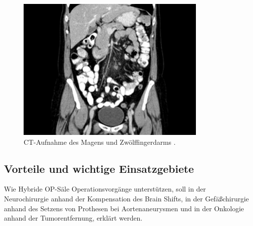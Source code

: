 \begin{figure}[!htb]
	\includegraphics[width=\linewidth]{Content/Pictures/mrtct.png}
	\caption{CT-Aufnahme des Magens und Zwölffingerdarms \cite{CTBild}.}
	\label{fig:mrtct}
	\endminipage
\end{figure}

\subsection{Vorteile und wichtige Einsatzgebiete}

Wie Hybride OP-Säle Operationsvorgänge unterstützen, soll in der Neurochirurgie anhand der Kompensation des Brain Shifts, in der Gefäßchirurgie anhand des Setzens von Prothesen bei Aortenaneurysmen und in der Onkologie anhand der Tumorentfernung, erklärt werden.


